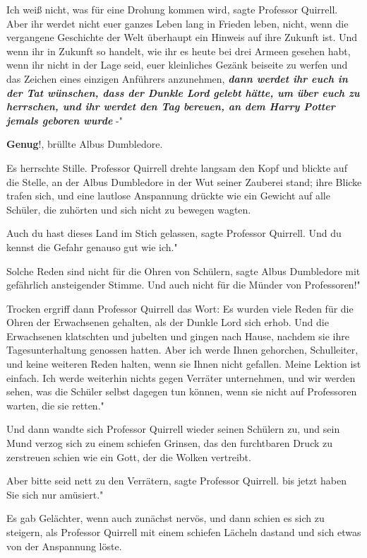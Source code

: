 \glqq Ich weiß nicht, was für eine Drohung kommen wird\grqq{}, sagte Professor
Quirrell. \glqq Aber ihr werdet nicht euer ganzes Leben lang in Frieden leben,
nicht, wenn die vergangene Geschichte der Welt überhaupt ein Hinweis auf ihre
Zukunft ist. Und wenn ihr in Zukunft so handelt, wie ihr es heute bei drei
Armeen gesehen habt, wenn ihr nicht in der Lage seid, euer kleinliches Gezänk
beiseite zu werfen und das Zeichen eines einzigen Anführers anzunehmen,
\textbf{\emph{dann werdet ihr euch in der Tat wünschen, dass der Dunkle Lord
gelebt hätte, um über euch zu herrschen, und ihr werdet den Tag bereuen, an dem
Harry Potter jemals geboren wurde }}-"

\glqq \textbf{Genug}!\grqq{}, brüllte Albus Dumbledore.

Es herrschte Stille. Professor Quirrell drehte langsam den Kopf und blickte auf
die Stelle, an der Albus Dumbledore in der Wut seiner Zauberei stand; ihre
Blicke trafen sich, und eine lautlose Anspannung drückte wie ein Gewicht auf
alle Schüler, die zuhörten und sich nicht zu bewegen wagten.

\glqq Auch du hast dieses Land im Stich gelassen\grqq{}, sagte Professor
Quirrell. \glqq Und du kennst die Gefahr genauso gut wie ich."

\glqq Solche Reden sind nicht für die Ohren von Schülern\grqq{}, sagte Albus
Dumbledore mit gefährlich ansteigender Stimme. \glqq Und auch nicht für die
Münder von Professoren!"

Trocken ergriff dann Professor Quirrell das Wort: \glqq Es wurden viele Reden
für die Ohren der Erwachsenen gehalten, als der Dunkle Lord sich erhob. Und die
Erwachsenen klatschten und jubelten und gingen nach Hause, nachdem sie ihre
Tagesunterhaltung genossen hatten. Aber ich werde Ihnen gehorchen, Schulleiter,
und keine weiteren Reden halten, wenn sie Ihnen nicht gefallen. Meine Lektion
ist einfach. Ich werde weiterhin nichts gegen Verräter unternehmen, und wir
werden sehen, was die Schüler selbst dagegen tun können, wenn sie nicht auf
Professoren warten, die sie retten."

Und dann wandte sich Professor Quirrell wieder seinen Schülern zu, und sein Mund
verzog sich zu einem schiefen Grinsen, das den furchtbaren Druck zu zerstreuen
schien wie ein Gott, der die Wolken vertreibt.

\glqq Aber bitte seid nett zu den Verrätern\grqq{}, sagte Professor Quirrell.
\glqq bis jetzt haben Sie sich nur amüsiert."

Es gab Gelächter, wenn auch zunächst nervös, und dann schien es sich zu
steigern, als Professor Quirrell mit einem schiefen Lächeln dastand und sich
etwas von der Anspannung löste.

